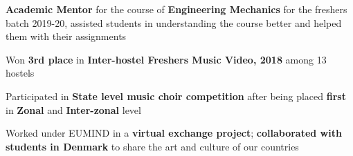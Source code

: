 
\begin{cventries}
	\vspace{-5.0mm}
	\cventry{}{}{}{}
	{
		\begin{cvitems}
			\item {\textbf{Academic Mentor} for the course of \textbf{Engineering Mechanics} for the freshers batch 2019-20, assisted students in understanding the course better and helped them with their assignments}
			\item {Won \textbf{3rd place} in \textbf{Inter-hostel Freshers Music Video, 2018} among 13 hostels}
			\item {Participated in \textbf{State level music choir competition} after being placed \textbf{first} in \textbf{Zonal} and \textbf{Inter-zonal} level}
			\item {Worked under EUMIND in a \textbf{virtual exchange project}; \textbf{collaborated with students in Denmark} to share the art and culture of our countries}
		\end{cvitems}
	}
\end{cventries}
